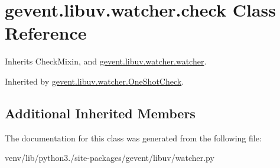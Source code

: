 \hypertarget{classgevent_1_1libuv_1_1watcher_1_1check}{}\section{gevent.\+libuv.\+watcher.\+check Class Reference}
\label{classgevent_1_1libuv_1_1watcher_1_1check}


Inherits Check\+Mixin, and \hyperlink{classgevent_1_1libuv_1_1watcher_1_1watcher}{gevent.\+libuv.\+watcher.\+watcher}.



Inherited by \hyperlink{classgevent_1_1libuv_1_1watcher_1_1_one_shot_check}{gevent.\+libuv.\+watcher.\+One\+Shot\+Check}.

\subsection*{Additional Inherited Members}


The documentation for this class was generated from the following file\+:\begin{DoxyCompactItemize}
\item 
venv/lib/python3./site-\/packages/gevent/libuv/watcher.\+py\end{DoxyCompactItemize}
